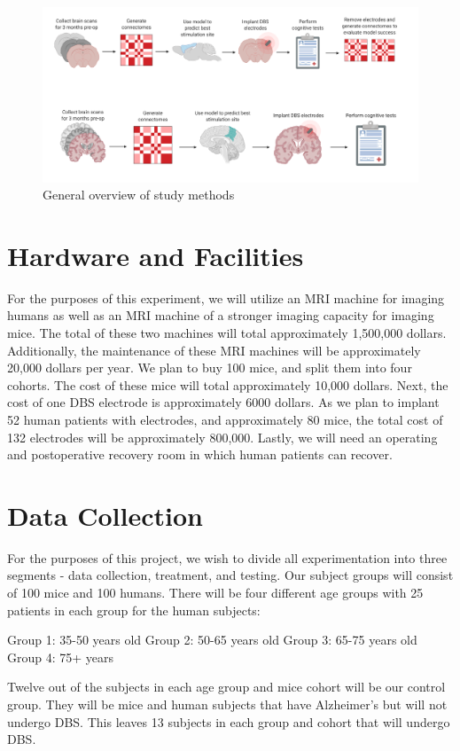 \documentclass{article}
\begin{document}
\begin{figure}[!]
\centering
\includegraphics[width=120mm, scale=0.5]{Connectomics.png}
\caption{General overview of study methods}
\label{fig:method}
\end{figure}

\section{Hardware and Facilities}
For the purposes of this experiment, we will utilize an MRI machine for imaging humans as well as an MRI machine of a stronger imaging capacity for imaging mice. The total of these two machines will total approximately 1,500,000 dollars. Additionally, the maintenance of these MRI machines will be approximately 20,000 dollars per year. We plan to buy 100 mice, and split them into four cohorts. The cost of these mice will total approximately 10,000 dollars. Next, the cost of one DBS electrode is approximately 6000 dollars. As we plan to implant 52 human patients with electrodes, and approximately 80 mice, the total cost of 132 electrodes will be approximately 800,000. Lastly, we will need an operating and postoperative recovery room in which human patients can recover. 


\section{Data Collection}
For the purposes of this project, we wish to divide all experimentation into three segments - data collection, treatment, and testing. Our subject groups will consist of 100 mice and 100 humans. There will be four different age groups with 25 patients in each group for the human subjects:

Group 1: 35-50 years old
Group 2: 50-65 years old
Group 3: 65-75 years old
Group 4: 75+ years

Twelve out of the subjects in each age group and mice cohort will be our control group. They will be mice and human subjects that have Alzheimer's but will not undergo DBS. This leaves 13 subjects in each group and cohort that will undergo DBS.
\end{document}
